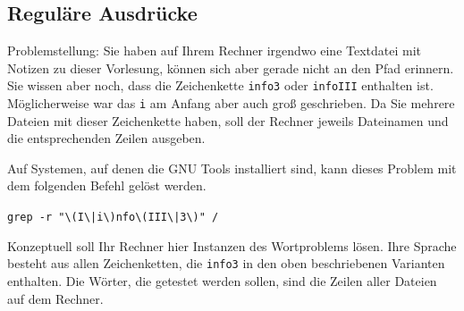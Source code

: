 %

\renewcommand{\llbracket}{[\![}
\renewcommand{\rrbracket}{]\!]}

\subsection{Reguläre Ausdrücke}%

Problemstellung: Sie haben auf Ihrem Rechner irgendwo eine Textdatei mit Notizen zu dieser Vorlesung, können sich aber gerade nicht an den Pfad erinnern.
Sie wissen aber noch, dass die Zeichenkette \texttt{info3} oder \texttt{infoIII} enthalten ist. 
Möglicherweise war das \texttt{i} am Anfang aber auch groß geschrieben.
Da Sie mehrere Dateien mit dieser Zeichenkette haben, soll der Rechner jeweils Dateinamen und die entsprechenden Zeilen ausgeben.

Auf Systemen, auf denen die GNU Tools installiert sind, kann dieses Problem mit dem folgenden Befehl gelöst werden.
\begin{center}
\verb+grep -r "\(I\|i\)nfo\(III\|3\)" /+ 
\end{center}



Konzeptuell soll Ihr Rechner hier Instanzen des Wortproblems lösen.
Ihre Sprache besteht aus allen Zeichenketten, die \texttt{info3} in den oben beschriebenen Varianten enthalten.
Die Wörter, die getestet werden sollen, sind die Zeilen aller Dateien auf dem Rechner.

